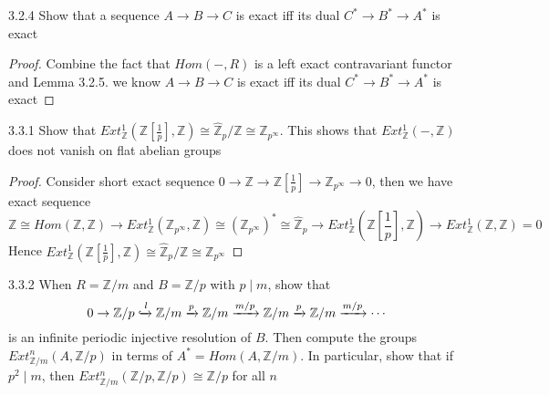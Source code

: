 \documentclass[../main.tex]{subfiles}
\begin{document}
\begin{customexercise}{3.2.4}
Show that a sequence $A\to B\to C$ is exact iff its dual $C^*\to B^*\to A^*$ is exact
\end{customexercise}

\begin{proof}
Combine the fact that $Hom(-,R)$ is a left exact contravariant functor and Lemma 3.2.5. we know $A\to B\to C$ is exact iff its dual $C^*\to B^*\to A^*$ is exact
\end{proof}

\begin{customexercise}{3.3.1}
Show that $Ext^1_\mathbb{Z}\left(\mathbb Z\left[\frac{1}{p}\right],\mathbb Z\right)\cong\widehat{\mathbb Z}_p/\mathbb Z\cong\mathbb Z_{p^\infty}$. This shows that $Ext^1_{\mathbb Z}(-,\mathbb Z)$ does not vanish on flat abelian groups
\end{customexercise}

\begin{proof}
Consider short exact sequence $0\to\mathbb Z\to\mathbb Z\left[\frac{1}{p}\right]\to\mathbb Z_{p^\infty}\to0$, then we have exact sequence
\[\mathbb Z\cong Hom(\mathbb Z,\mathbb Z)\to Ext_\mathbb{Z}^1(\mathbb Z_{p^\infty},\mathbb Z)\cong(\mathbb Z_{p^\infty})^*\cong\widehat{\mathbb Z}_p\to Ext_{\mathbb Z}^1\left(\textstyle\mathbb Z\left[\frac{1}{p}\right],\mathbb Z\right)\to Ext_{\mathbb Z}^1(\mathbb Z,\mathbb Z)=0\]
Hence $Ext^1_\mathbb{Z}\left(\mathbb Z\left[\frac{1}{p}\right],\mathbb Z\right)\cong\widehat{\mathbb Z}_p/\mathbb Z\cong\mathbb Z_{p^\infty}$
\end{proof}

\begin{customexercise}{3.3.2}
When $R=\mathbb Z/m$ and $B=\mathbb Z/p$ with $p\mid m$, show that
\[0\to\mathbb Z/p\xhookrightarrow{l}\mathbb Z/m\xrightarrow{p}\mathbb Z/m\xrightarrow{m/p}\mathbb Z/m\xrightarrow{p}\mathbb Z/m\xrightarrow{m/p}\cdots\]
is an infinite periodic injective resolution of $B$. Then compute the groups $Ext^n_{\mathbb Z/m}(A,\mathbb Z/p)$ in terms of $A^*=Hom(A,\mathbb Z/m)$. In particular, show that if $p^2\mid m$, then $Ext^n_{\mathbb Z/m}(\mathbb Z/p,\mathbb Z/p)\cong\mathbb Z/p$ for all $n$
\end{customexercise}
\end{document}
